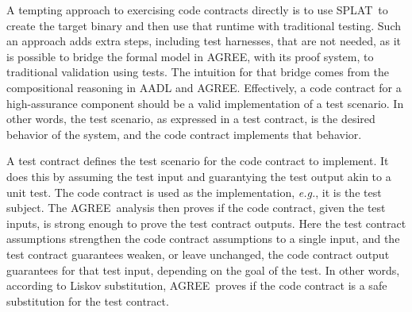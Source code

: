 \documentclass[global,twocolumn]{svjour}
\newcommand{\agr}{AGREE}
\newcommand{\splt}{SPLAT}
\newcommand{\eg}{\textit{e.g.}}
\begin{document}
A tempting approach to exercising code contracts directly is to use \splt\ to create the target binary and then use that runtime with traditional testing.
%
Such an approach adds extra steps, including test harnesses, that are not needed, as it is possible to bridge the formal model in \agr, with its proof system, to traditional validation using tests.
%
The intuition for that bridge comes from the compositional reasoning in AADL and \agr.
%
Effectively, a code contract for a high-assurance component should be a valid implementation of a test scenario.
%
In other words, the test scenario, as expressed in a test contract, is the desired behavior of the system, and the code contract implements that behavior.

A test contract defines the test scenario for the code contract to implement.
%
It does this by assuming the test input and guarantying the test output akin to a unit test.
%
The code contract is used as the implementation, \eg, it is the test subject.
%
The \agr\ analysis then proves if the code contract, given the test inputs, is strong enough to prove the test contract outputs.
%
Here the test contract assumptions strengthen the code contract assumptions to a single input, and the test contract guarantees weaken, or leave unchanged, the code contract output guarantees for that test input, depending on the goal of the test.
%
In other words, according to Liskov substitution, \agr\ proves if the code contract is a safe substitution for the test contract.
\end{document}
